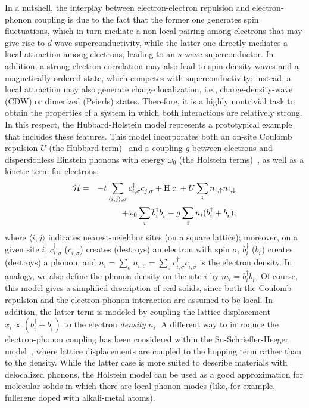 \documentclass[aps,superscriptaddress,amsmath,amssymb,twocolumn,showpacs,floatfix,english]{revtex4}
\newcommand{\dagga}{{\phantom{\dagger}}}
\begin{document}
In a nutshell, the interplay between electron-electron repulsion and electron-phonon coupling is due to the fact that the former one 
generates spin fluctuations, which in turn mediate a non-local pairing among electrons that may give rise to $d$-wave superconductivity,
while the latter one directly mediates a local attraction among electrons, leading to an $s$-wave superconductor. In addition, a strong 
electron correlation may also lead to spin-density waves and a magnetically ordered state, which competes with superconductivity; instead,
a local attraction may also generate charge localization, i.e., charge-density-wave (CDW) or dimerized (Peierls) states. Therefore, it 
is a highly nontrivial task to obtain the properties of a system in which both interactions are relatively strong. In this respect, the 
Hubbard-Holstein model represents a prototypical example that includes these features. This model incorporates both an on-site Coulomb 
repulsion $U$ (the Hubbard term)~\cite{Hubbard1963} and a coupling $g$ between electrons and dispersionless Einstein phonons with 
energy $\omega_0$ (the Holstein terms)~\cite{Holstein1959}, as well as a kinetic term for electrons:
\begin{eqnarray}
{\cal H} = &&-t \sum_{\langle i,j \rangle, \sigma} c^\dag_{i,\sigma} c^\dagga_{j,\sigma} + {\rm H.c.} 
+U \sum_{i} n_{i,\uparrow} n_{i,\downarrow} \nonumber \\ 
&&+\omega_0 \sum_{i} b^\dag_i b^\dagga_i +g \sum_{i} n_{i} (b^\dag_i + b^\dagga_i),
\label{eq:HHmodel}
\end{eqnarray}
where $\langle i,j \rangle$ indicates nearest-neighbor sites (on a square lattice); moreover, on a given site $i$, $c^\dag_{i,\sigma}$ 
($c^\dagga_{i,\sigma}$) creates (destroys) an electron with spin $\sigma$, $b^\dag_i$ ($b^\dagga_i$) creates (destroys) a phonon, and 
$n_{i}=\sum_{\sigma} n_{i,\sigma}=\sum_{\sigma} c^\dag_{i,\sigma} c^\dagga_{i,\sigma}$ is the electron density. In analogy, we also 
define the phonon density on the site $i$ by $m_{i}=b^\dag_{i} b^\dagga_{i}$. Of course, this model gives a simplified description of 
real solids, since both the Coulomb repulsion and the electron-phonon interaction are assumed to be local. In addition, the latter term 
is modeled by coupling the lattice displacement $x_{i} \propto (b^\dag_{i}+b^\dagga_{i})$ to the electron {\it density} $n_{i}$. 
A different way to introduce the electron-phonon coupling has been considered within the Su-Schrieffer-Heeger model~\cite{Su1979}, where 
lattice displacements are coupled to the hopping term rather than to the density. While the latter case is more suited to describe 
materials with delocalized phonons, the Holstein model can be used as a good approximation for molecular solids in which there are local 
phonon modes (like, for example, fullerene doped with alkali-metal atoms).
\end{document}
